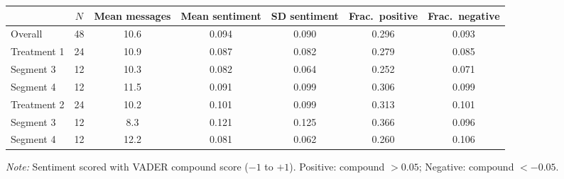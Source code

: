 \begingroup
\centering
\small
\begin{tabular}{lcccccc}
\toprule
 & $N$ & Mean messages & Mean sentiment & SD sentiment & Frac.\ positive & Frac.\ negative \\
\midrule
  Overall & 48 & 10.6 & 0.094 & 0.090 & 0.296 & 0.093 \\
  Treatment 1 & 24 & 10.9 & 0.087 & 0.082 & 0.279 & 0.085 \\
  \quad Segment 3 & 12 & 10.3 & 0.082 & 0.064 & 0.252 & 0.071 \\
  \quad Segment 4 & 12 & 11.5 & 0.091 & 0.099 & 0.306 & 0.099 \\
  Treatment 2 & 24 & 10.2 & 0.101 & 0.099 & 0.313 & 0.101 \\
  \quad Segment 3 & 12 & 8.3 & 0.121 & 0.125 & 0.366 & 0.096 \\
  \quad Segment 4 & 12 & 12.2 & 0.081 & 0.062 & 0.260 & 0.106 \\
\bottomrule
\end{tabular}
\par
\vspace{2pt}
{\footnotesize \textit{Note:} Sentiment scored with VADER compound score ($-1$ to $+1$). Positive: compound $> 0.05$; Negative: compound $< -0.05$.}
\endgroup
